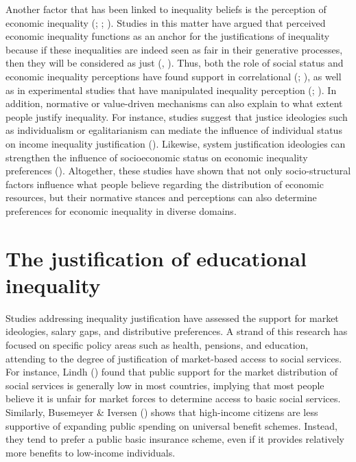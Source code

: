 \documentclass[
  12pt,
  a4paper,
]{article}
\begin{document}
Another factor that has been linked to inequality beliefs is the perception of economic inequality (; ; ). Studies in this matter have argued that perceived economic inequality functions as an anchor for the justifications of inequality because if these inequalities are indeed seen as fair in their generative processes, then they will be considered as just (, ). Thus, both the role of social status and economic inequality perceptions have found support in correlational (; ), as well as in experimental studies that have manipulated inequality perception (; ). In addition, normative or value-driven mechanisms can also explain to what extent people justify inequality. For instance, studies suggest that justice ideologies such as individualism or egalitarianism can mediate the influence of individual status on income inequality justification (). Likewise, system justification ideologies can strengthen the influence of socioeconomic status on economic inequality preferences (). Altogether, these studies have shown that not only socio-structural factors influence what people believe regarding the distribution of economic resources, but their normative stances and perceptions can also determine preferences for economic inequality in diverse domains.

\section{The justification of educational inequality}\label{the-justification-of-educational-inequality}

Studies addressing inequality justification have assessed the support for market ideologies, salary gaps, and distributive preferences. A strand of this research has focused on specific policy areas such as health, pensions, and education, attending to the degree of justification of market-based access to social services. For instance, Lindh () found that public support for the market distribution of social services is generally low in most countries, implying that most people believe it is unfair for market forces to determine access to basic social services. Similarly, Busemeyer \& Iversen () shows that high-income citizens are less supportive of expanding public spending on universal benefit schemes. Instead, they tend to prefer a public basic insurance scheme, even if it provides relatively more benefits to low-income individuals.
\end{document}

